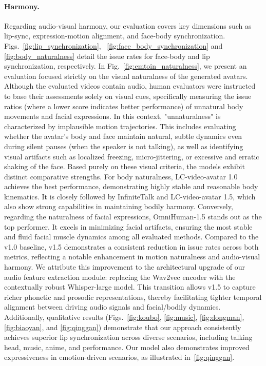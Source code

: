 \paragraph{Harmony.}
Regarding audio-visual harmony, our evaluation covers key dimensions such as lip-sync, expression-motion alignment, and face-body synchronization. Figs.~\ref{fig:lip_synchronization}, ~\ref{fig:face_body_synchronization} and \ref{fig:body_naturalness} detail the issue rates for face-body and lip synchronization, respectively. 
In Fig.~\ref{fig:emtoin_naturalness}, we present an evaluation focused strictly on the visual naturalness of the generated avatars. Although the evaluated videos contain audio, human evaluators were instructed to base their assessments solely on visual cues, specifically measuring the issue ratios (where a lower score indicates better performance) of unnatural body movements and facial expressions. In this context, "unnaturalness" is characterized by implausible motion trajectories. This includes evaluating whether the avatar's body and face maintain natural, subtle dynamics even during silent pauses (when the speaker is not talking), as well as identifying visual artifacts such as localized freezing, micro-jittering, or excessive and erratic shaking of the face. Based purely on these visual criteria, the models exhibit distinct comparative strengths. For body naturalness, LC-video-avatar 1.0 achieves the best performance, demonstrating highly stable and reasonable body kinematics. It is closely followed by InfiniteTalk and LC-video-avatar 1.5, which also show strong capabilities in maintaining bodily harmony. Conversely, regarding the naturalness of facial expressions, OmniHuman-1.5 stands out as the top performer. It excels in minimizing facial artifacts, ensuring the most stable and fluid facial muscle dynamics among all evaluated methods.
Compared to the v1.0 baseline, v1.5 demonstrates a consistent reduction in issue rates across both metrics, reflecting a notable enhancement in motion naturalness and audio-visual harmony. We attribute this improvement to the architectural upgrade of our audio feature extraction module: replacing the Wav2vec encoder with the contextually robust Whisper-large model. This transition allows v1.5 to capture richer phonetic and prosodic representations, thereby facilitating tighter temporal alignment between driving audio signals and facial/bodily dynamics. Additionally, qualitative results (Figs.~\ref{fig:koubo}, \ref{fig:music}, \ref{fig:dongman}, \ref{fig:biaoyan}, and \ref{fig:qinggan}) demonstrate that our approach consistently achieves superior lip synchronization across diverse scenarios, including talking head, music, anime, and performance. Our model also demonstrates improved expressiveness in emotion-driven scenarios, as illustrated in~\ref{fig:qinggan}.
 
